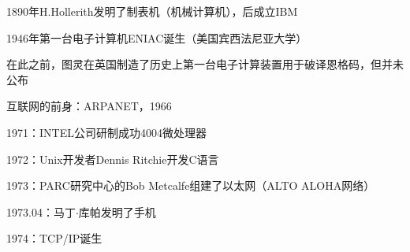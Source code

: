 1890年H.Hollerith发明了制表机（机械计算机），后成立IBM

1946年第一台电子计算机ENIAC诞生（美国宾西法尼亚大学）

在此之前，图灵在英国制造了历史上第一台电子计算装置用于破译恩格码，但并未公布
\begin{notation}
    互联网的前身：ARPANET，1966

    1971：INTEL公司研制成功4004微处理器

    1972：Unix开发者Dennis Ritchie开发C语言

    1973：PARC研究中心的Bob Metcalfe组建了以太网（ALTO ALOHA网络）

    1973.04：马丁$\cdot $库帕发明了手机

    1974：TCP/IP诞生
\end{notation}

